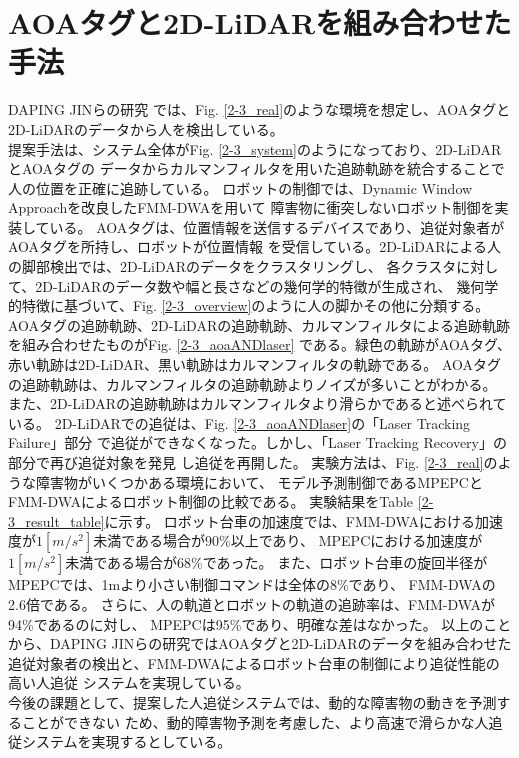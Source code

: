 \section{AOAタグと2D-LiDARを組み合わせた手法}
DAPING JINらの研究\cite{A Robust Autonomous Following Method for Mobile Robots in Dynamic Environments}
では、Fig. \ref{2-3_real}のような環境を想定し、AOAタグと2D-LiDARのデータから人を検出している。\\ \indent
提案手法は、システム全体がFig. \ref{2-3_system}のようになっており、2D-LiDARとAOAタグの
データからカルマンフィルタを用いた追跡軌跡を統合することで人の位置を正確に追跡している。
ロボットの制御では、Dynamic Window Approachを改良したFMM-DWAを用いて
障害物に衝突しないロボット制御を実装している。
AOAタグは、位置情報を送信するデバイスであり、追従対象者がAOAタグを所持し、ロボットが位置情報
を受信している。2D-LiDARによる人の脚部検出では、2D-LiDARのデータをクラスタリングし、
各クラスタに対して、2D-LiDARのデータ数や幅と長さなどの幾何学的特徴が生成され、
幾何学的特徴に基づいて、Fig. \ref{2-3_overview}のように人の脚かその他に分類する。
AOAタグの追跡軌跡、2D-LiDARの追跡軌跡、カルマンフィルタによる追跡軌跡
を組み合わせたものがFig. \ref{2-3_aoaANDlaser}
である。緑色の軌跡がAOAタグ、赤い軌跡は2D-LiDAR、黒い軌跡はカルマンフィルタの軌跡である。
AOAタグの追跡軌跡は、カルマンフィルタの追跡軌跡よりノイズが多いことがわかる。
また、2D-LiDARの追跡軌跡はカルマンフィルタより滑らかであると述べられている。
2D-LiDARでの追従は、Fig. \ref{2-3_aoaANDlaser}の「Laser Tracking Failure」部分
で追従ができなくなった。しかし、「Laser Tracking Recovery」の部分で再び追従対象を発見
し追従を再開した。
実験方法は、Fig. \ref{2-3_real}のような障害物がいくつかある環境において、
モデル予測制御であるMPEPCとFMM-DWAによるロボット制御の比較である。
実験結果をTable \ref{2-3_result_table}に示す。
ロボット台車の加速度では、FMM-DWAにおける加速度が$1[m/s^2]$未満である場合が90\%以上であり、
MPEPCにおける加速度が$1[m/s^2]$未満である場合が68\%であった。
また、ロボット台車の旋回半径がMPEPCでは、1mより小さい制御コマンドは全体の8\%であり、
FMM-DWAの2.6倍である。
さらに、人の軌道とロボットの軌道の追跡率は、FMM-DWAが94\%であるのに対し、
MPEPCは95\%であり、明確な差はなかった。
以上のことから、DAPING JINらの研究ではAOAタグと2D-LiDARのデータを組み合わせた
追従対象者の検出と、FMM-DWAによるロボット台車の制御により追従性能の高い人追従
システムを実現している。\\ \indent
今後の課題として、提案した人追従システムでは、動的な障害物の動きを予測することができない
ため、動的障害物予測を考慮した、より高速で滑らかな人追従システムを実現するとしている。

